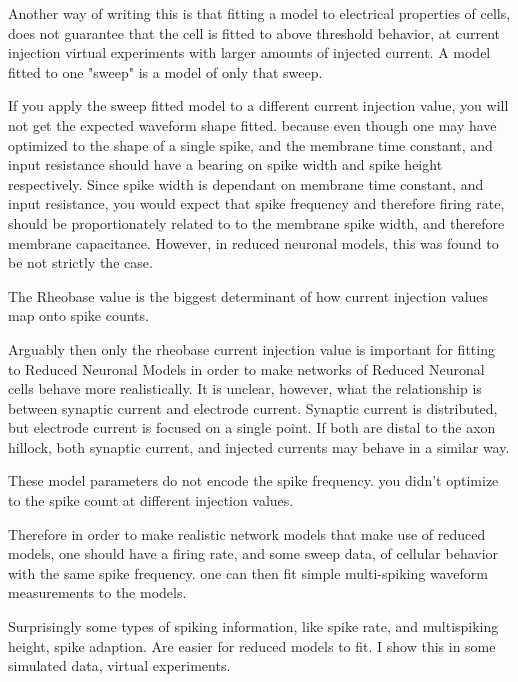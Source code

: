 Another way of writing this is that fitting a model to electrical properties of cells, does not
guarantee that the cell is fitted to above threshold behavior, at current injection virtual experiments with larger amounts of injected current.
A model fitted to one "sweep" is a model of only that sweep. 

If you apply the sweep fitted model to a different current injection value, you will not get the expected waveform shape fitted.
because even though one may have optimized to the shape of a single spike, and the membrane time constant, and input resistance should have a bearing
 on spike width and spike height respectively. Since spike width is dependant on membrane time constant, and input resistance, you 
 would expect that spike frequency and therefore firing rate, should be proportionately related to 
 to the membrane spike width, and therefore membrane capacitance. However, in reduced neuronal models, this was found
 to be not strictly the case.

 The Rheobase value is the biggest determinant of how current injection values map onto spike counts.


 Arguably then only the rheobase current injection value is important for fitting to Reduced Neuronal Models in order to make networks of Reduced Neuronal cells behave more realistically.
 It is unclear, however, what the relationship is between synaptic current and electrode current. Synaptic current is distributed, but electrode current is focused on a single point.
 If both are distal to the axon hillock, both synaptic current, and injected currents may behave in a similar way.


These model parameters do not encode the spike frequency.
you didn't optimize to the spike count at different injection values.

Therefore in order to make realistic network models that make use of reduced models, 
one should have a firing rate, and some sweep data, of cellular behavior with the same spike frequency.
one can then fit simple multi-spiking waveform measurements to the models.

Surprisingly some types of spiking information, like spike rate, and multispiking height, spike adaption.
Are easier for reduced models to fit. I show this in some simulated data, virtual experiments.


